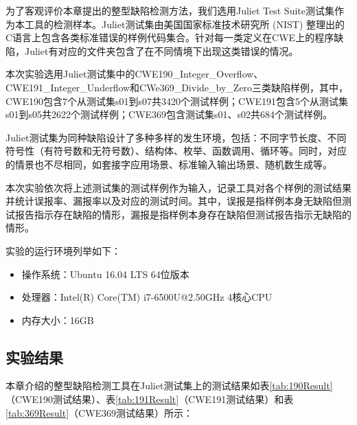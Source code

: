 为了客观评价本章提出的整型缺陷检测方法，我们选用Juliet Test Suite测试集作为本工具的检测样本。Juliet测试集由美国国家标准技术研究所 (NIST) 整理出的C语言上包含各类标准错误的样例代码集合。针对每一类定义在CWE上的程序缺陷，Juliet有对应的文件夹包含了在不同情境下出现这类错误的情况。

本次实验选用Juliet测试集中的CWE190\_Integer\_Overflow、CWE191\_Integer\_Underflow和CWe369\_Divide\_by\_Zero三类缺陷样例，其中，CWE190包含7个从测试集s01到s07共3420个测试样例；CWE191包含5个从测试集s01到s05共2622个测试样例；CWE369包含测试集s01、s02共684个测试样例。

Juliet测试集为同种缺陷设计了多种多样的发生环境，包括：不同字节长度、不同符号性（有符号数和无符号数）、结构体、枚举、函数调用、循环等。同时，对应的情景也不尽相同，如套接字应用场景、标准输入输出场景、随机数生成等。

本次实验依次将上述测试集的测试样例作为输入，记录工具对各个样例的测试结果并统计误报率、漏报率以及对应的测试时间。其中，误报是指样例本身无缺陷但测试报告指示存在缺陷的情形，漏报是指样例本身存在缺陷但测试报告指示无缺陷的情形。

实验的运行环境列举如下：
\begin{itemize}
	\item 操作系统：Ubuntu 16.04 LTS 64位版本
	\item 处理器：Intel(R) Core(TM) i7-6500U@2.50GHz 4核心CPU
	\item 内存大小：16GB
\end{itemize}

\subsection{实验结果}
\label{sec:区间算数实验结果}

本章介绍的整型缺陷检测工具在Juliet测试集上的测试结果如表\ref{tab:190Result}（CWE190测试结果）、表\ref{tab:191Result}（CWE191测试结果）和表\ref{tab:369Result}（CWE369测试结果）所示：

